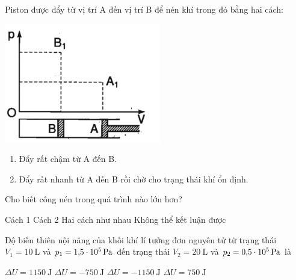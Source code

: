 \begin{ex}
	Piston được đẩy từ vị trí A đến vị trí B để nén khí trong đó bằng hai cách:
	\begin{center}
		\includegraphics[width=0.35\linewidth]{figs/VN12-Y24-PH-SYL-015P-3}
	\end{center}
	\begin{enumerate}[label=(\arabic*)]
		\item Đẩy rất chậm từ A đến B.
		\item Đẩy rất nhanh từ A đến B rồi chờ cho trạng thái khí ổn định.
	\end{enumerate}
	Cho biết công nén trong quá trình nào lớn hơn?
	
	\choice
	{Cách 1}
	{\True Cách 2}
	{Hai cách như nhau}
	{Không thể kết luận được}
\end{ex}
\begin{ex}
	Độ biến thiên nội năng của khối khí lí tưởng đơn nguyên tử từ trạng thái $V_1=\SI{10}{\liter}$ và $p_1=\SI{1.5E5}{\pascal}$ đến trạng thái $V_2=\SI{20}{\liter}$ và $p_2=\SI{0.5E5}{\pascal}$ là
	
	\choice
	{$\Delta U=\SI{1150}{\joule}$}
	{\True $\Delta U=\SI{-750}{\joule}$}
	{$\Delta U=\SI{-1150}{\joule}$}
	{$\Delta U=\SI{750}{\joule}$}
\end{ex}
